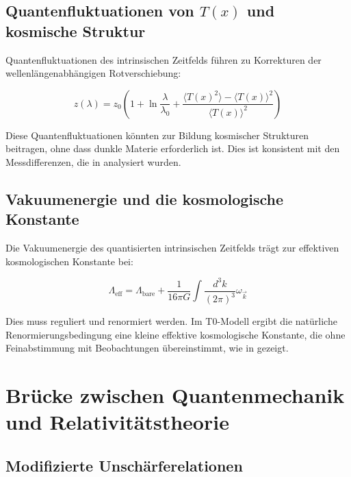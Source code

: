 \documentclass[12pt,a4paper]{article}
\newcommand{\Tfield}{T(x)}
\begin{document}
	\subsection{Quantenfluktuationen von $\Tfield$ und kosmische Struktur}
	\label{sec:quantenfluktuationen}
	
	Quantenfluktuationen des intrinsischen Zeitfelds führen zu Korrekturen der wellenlängenabhängigen Rotverschiebung:
	
	\begin{equation}
		z(\lambda) = z_0\left(1 + \ln\frac{\lambda}{\lambda_0} + \frac{\langle \Tfield^2 \rangle - \langle \Tfield \rangle^2}{\langle \Tfield \rangle^2}\right)
	\end{equation}
	
	Diese Quantenfluktuationen könnten zur Bildung kosmischer Strukturen beitragen, ohne dass dunkle Materie erforderlich ist. Dies ist konsistent mit den Messdifferenzen, die in \cite{pascher_messdifferenzen_2025} analysiert wurden.
	
	\subsection{Vakuumenergie und die kosmologische Konstante}
	\label{sec:vakuumenergie}
	
	Die Vakuumenergie des quantisierten intrinsischen Zeitfelds trägt zur effektiven kosmologischen Konstante bei:
	
	\begin{equation}
		\Lambda_{\text{eff}} = \Lambda_{\text{bare}} + \frac{1}{16\pi G}\int \frac{d^3k}{(2\pi)^3} \omega_{\vec{k}}
	\end{equation}
	
	Dies muss reguliert und renormiert werden. Im T0-Modell ergibt die natürliche Renormierungsbedingung eine kleine effektive kosmologische Konstante, die ohne Feinabstimmung mit Beobachtungen übereinstimmt, wie in \cite{pascher_temp_2025} gezeigt.
	
	\section{Brücke zwischen Quantenmechanik und Relativitätstheorie}
	\label{sec:bruecke_qm_rt}
	
	\subsection{Modifizierte Unschärferelationen}
	\label{sec:unschaerferelationen}
	
\end{document}
